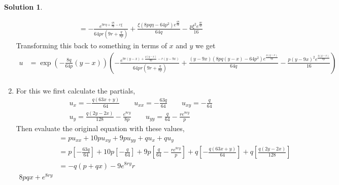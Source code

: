 \documentclass[10pt]{article}
\theoremstyle{definition}
\newtheorem{soln}{Solution}
\begin{document}
\begin{soln}
\begin{enumerate}[label=(\alph*)]
\begin{align*}
                                                 & =-\frac{e^{9r{\eta} + \frac{q{\eta}}{8p} - r{\xi}}}{64pr \left(9r + \frac{q}{8p}\right)} + \frac{{\xi} \left(8pq{\eta} - 64p^{2}\right) e^{\frac{q{\eta}}{8p}}}{64q} - \frac{p{\xi}^{2} e^{\frac{q{\eta}}{8p}}}{16}
          \end{align*}
          Transforming this back to something in terms of $x$ and $y$ we get
          \begin{align*}
            u & =\exp\left(-\frac{8q}{64p}(y-x)\right)\left(-\frac{e^{9r{(y-x)} + \frac{q{(y-x)}}{8p} - r{(y-9x)}}}{64pr \left(9r + \frac{q}{8p}\right)} + \frac{(y-9x) \left(8pq{(y-x)} - 64p^{2}\right) e^{\frac{q{(y-x)}}{8p}}}{64q} - \frac{p(y-9x)^{2} e^{\frac{q{(y-x)}}{8p}}}{16}\right)            \\
          \end{align*}
    \item For this we first calculate the partials,
          \begin{align*}
             & u_x=-\frac{q \left(63x + y\right)}{64} \qquad u_{xx}=-\frac{63q}{64} \qquad u_{xy}=-\frac{q}{64}                     \\
             & u_y=\frac{q \left(2y - 2x\right)}{128} - \frac{e^{8ry}}{8p} \qquad u_{yy}=\frac{q}{64} - \frac{re^{8ry}}{p}
          \end{align*}
          Then evaluate the original equation with these values,
          \begin{align*}
             & =pu_{xx}+10pu_{xy}+9pu_{yy}+qu_x+qu_y                            \\
             & =p\left[-\frac{63q}{64}\right]+
            10p\left[-\frac{q}{64}\right]+
            9p\left[\frac{q}{64} - \frac{re^{8ry}}{p}\right]+
            q\left[-\frac{q \left(63x + y\right)}{64}\right]+
            q\left[\frac{q \left(2y - 2x\right)}{128}\right]                    \\
             & =-q\left(p+qx\right)-9e^{8ry}r \\
             8pqx+e^{8ry}
          \end{align*}
  \end{enumerate}
\end{soln}
\end{document}
